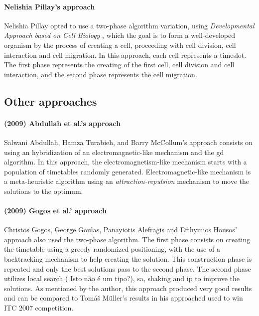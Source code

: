 \paragraph{Nelishia Pillay's approach}
Nelishia Pillay opted to use a two-phase algorithm variation, using \textit{Developmental Approach based on Cell Biology} \cite{Pillay2007}, which the goal is to form a well-developed organism by the process of creating a cell, proceeding with cell division, cell interaction and cell migration. In this approach, each cell represents a timeslot. The first phase represents the creating of the first cell, cell division and cell interaction, and the second phase represents the cell migration.

\subsection{Other approaches}
\label{subsection:OtherAppr}

\paragraph{(2009) Abdullah et al.'s approach}
Salwani Abdullah, Hamza Turabieh, and Barry McCollum's approach \cite{Abdullah2009} consists on using an hybridization of an electromagnetic-like mechanism and the \gls{gd} algorithm. In this approach, the electromagnetism-like mechanism starts with a population of timetables randomly generated. Electromagnetic-like mechanism is a meta-heuristic algorithm using an \textit{attraction-repulsion} mechanism \cite{Javadian2008} to move the solutions to the optimum.\\

\paragraph{(2009) Gogos et al.' approach}
Christos Gogos, George Goulas, Panayiotis Alefragis and Efthymios Housos' approach \cite{Gogos2009} also used the two-phase algorithm. The first phase consists on creating the timetable using a greedy randomized positioning, with the use of a backtracking mechanism to help creating the solution. This construction phase is repeated and only the best solutions pass to the second phase. The second phase utilizes local search ({\color{red} Isto não é um tipo?}), \gls{sa}, shaking and \gls{ip} to improve the solutions. As mentioned by the author, this approach produced very good results  and can be compared to Tom\'{a}\v{s} M\"{u}ller's results in his approached used to win ITC 2007 competition.\\

